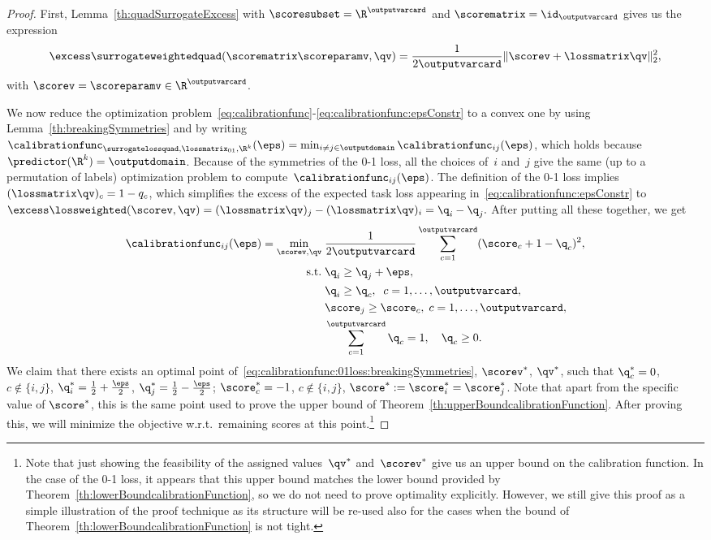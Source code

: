 \documentclass{article}
\begin{document}
\begin{proof}
First, Lemma~\ref{th:quadSurrogateExcess} with $\scoresubset = \R^{\outputvarcard}$ and $\scorematrix = \id_\outputvarcard$ gives us the expression
\begin{equation}
\label{eq:quadSurrogateExcessSimple:noConstrainst}
\excess\surrogateweightedquad(\scorematrix\scoreparamv, \qv) = \frac{1}{2\outputvarcard}\|\scorev + \lossmatrix \qv \|_2^2,
\end{equation}
with $\scorev = \scoreparamv \in \R^{\outputvarcard}$.

We now reduce the optimization problem~\eqref{eq:calibrationfunc}-\eqref{eq:calibrationfunc:epsConstr} to a convex one by using Lemma~\ref{th:breakingSymmetries} and by writing 
$
\calibrationfunc_{\surrogatelossquad,\lossmatrix_{01},\R^k}(\eps) = \min_{i \neq j \in \outputdomain}\calibrationfunc_{ij}(\eps)
$, which holds because $\predictor(\R^k) = \outputdomain$.
%
%
Because of the symmetries of the 0-1 loss, all the choices of~$i$ and~$j$ give the same (up to a permutation of labels) optimization problem to compute~$\calibrationfunc_{ij}(\eps)$.
The definition of the 0-1 loss implies $(\lossmatrix \qv)_c = 1-q_c$, which simplifies the excess of the expected task loss appearing in~\eqref{eq:calibrationfunc:epsConstr} to
$
%
%
\excess\lossweighted(\scorev, \qv) = (\lossmatrix \qv)_j - (\lossmatrix \qv)_i = \q_i - \q_j.
%
$
After putting all these together, we get
\begin{align}
\label{eq:calibrationfunc:01loss:breakingSymmetries}
\calibrationfunc_{ij}(\eps)
=
\min_{\scorev, \qv} \;& \frac{1}{2 \outputvarcard} \sum_{c=1}^{\outputvarcard} (\score_c + 1 - \q_c)^2, \\
\notag %
\text{s.t.} \;& \q_i \geq \q_j + \eps,\\
\notag %
&\q_i \geq \q_c,\;\; c = 1,\dots,\outputvarcard, \\
\notag %
&\score_j \geq \score_c,\; c = 1,\dots,\outputvarcard, \\
\notag %
& \sum_{c=1}^{\outputvarcard} \q_c = 1, \quad \q_c \geq 0.
\end{align}
We claim that there exists an optimal point of~\eqref{eq:calibrationfunc:01loss:breakingSymmetries}, $\scorev^*$, $\qv^*$, such that $\q^*_c=0$, $c\not\in\{i, j\}$, $\q^*_i = \frac12 + \frac{\eps}{2}$,  $\q^*_j = \frac12 - \frac{\eps}{2}$; $\score^*_c = -1$, $c\not\in\{i, j\}$, $\score^*:= \score^*_i = \score^*_j$.
Note that apart from the specific value of $\score^*$, this is the same point used to prove the upper bound of Theorem~\ref{th:upperBoundcalibrationFunction}.
After proving this, we will minimize the objective w.r.t.\ remaining scores at this point.\footnote{Note that just showing the feasibility of the assigned values~$\qv^*$ and~$\scorev^*$ give us an upper bound on the calibration function.
In the case of the 0-1 loss, it appears that this upper bound matches the lower bound provided by Theorem~\ref{th:lowerBoundcalibrationFunction}, so we do not need to prove optimality explicitly.
However, we still give this proof as a simple illustration of the proof technique as its structure will be re-used also for the cases when the bound of Theorem~\ref{th:lowerBoundcalibrationFunction} is not tight.}


\end{proof}
\end{document}
